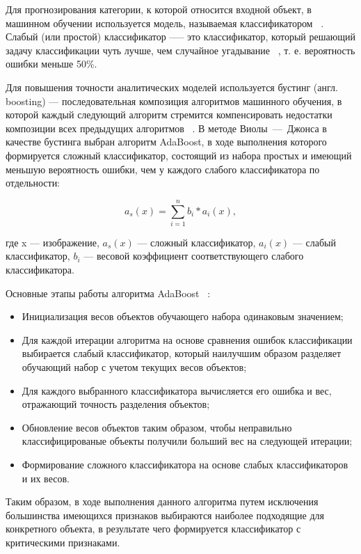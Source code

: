 \begin{enumerate}
    Для прогнозирования категории, к которой относится входной объект, в машинном обучении используется модель, называемая классификатором ~\cite{classifier}. Слабый (или простой) классификатор —-- это классификатор, который решающий задачу классификации чуть лучше, чем случайное угадывание ~\cite{weak}, т. е. вероятность ошибки меньше 50\%. 

    Для повышения точности аналитических моделей используется бустинг (англ. boosting) --- последовательная композиция алгоритмов машинного обучения, в которой каждый следующий алгоритм стремится компенсировать недостатки композиции всех предыдущих алгоритмов ~\cite{tomsk}. 
    В методе Виолы~---~Джонса в качестве бустинга выбран алгоритм AdaBoost, в ходе выполнения которого формируется сложный классификатор, состоящий из набора простых и имеющий меньшую вероятность ошибки, чем у каждого слабого классификатора по отдельности:

    \begin{equation}
        a_s(x) = \sum_{i=1}^{n}b_i * a_i(x),
    \end{equation}

    где x --- изображение, $a_s(x)$ --- сложный классификатор, $a_i(x)$ --- слабый классификатор, $b_i$ --- весовой коэффициент соответствующего слабого классификатора.

    Основные этапы работы алгоритма AdaBoost ~\cite{viola}:

    \begin{itemize}
        \item Инициализация весов объектов обучающего набора одинаковым значением;
        \item Для каждой итерации алгоритма на основе сравнения ошибок классификации выбирается слабый классификатор, который наилучшим образом разделяет обучающий набор с учетом текущих весов объектов;
        \item Для каждого выбранного классификатора вычисляется его ошибка и вес, отражающий точность разделения объектов;
        \item Обновление весов объектов таким образом, чтобы неправильно классифицированые объекты получили больший вес на следующей итерации;
        \item Формирование сложного классификатора на основе слабых классификаторов и их весов.
    \end{itemize}
    
    Таким образом, в ходе выполнения данного алгоритма путем исключения большинства имеющихся признаков выбираются наиболее подходящие для конкретного объекта, в результате чего формируется классификатор с критическими признаками.


\end{enumerate}
